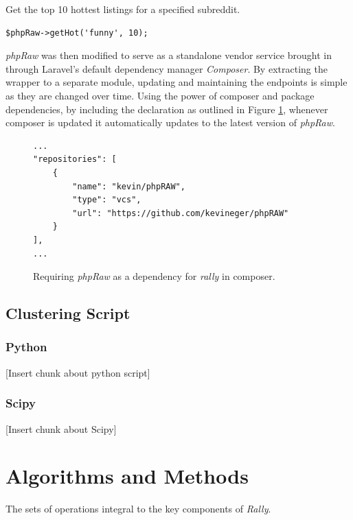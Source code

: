 \documentclass[msc,oneside]{ubcthesis}%
\begin{document}
\begin{center}
Get the top 10 hottest listings for a specified subreddit.
\end{center}
\begin{lstlisting}
$phpRaw->getHot('funny', 10);
\end{lstlisting}
\par
\textit{phpRaw} was then modified to serve as a standalone vendor service brought in through Laravel's default dependency manager \textit{Composer}. By extracting the wrapper to a separate module, updating and maintaining the endpoints is simple as they are changed over time. Using the power of composer and package dependencies, by including the declaration as outlined in Figure \ref{fig:composer}, whenever composer is updated it automatically updates to the latest version of \textit{phpRaw}.

\begin{figure}[!htb]
\begin{lstlisting}
...
"repositories": [
	{
		"name": "kevin/phpRAW",
		"type": "vcs",
		"url": "https://github.com/kevineger/phpRAW"
	}
],
...
\end{lstlisting}
\caption[Requiring phpRaw as a dependency in composer.]{
Requiring \textit{phpRaw} as a dependency for \textit{rally} in composer.}
\label{fig:composer}
\end{figure}

\section{Clustering Script}
\subsection{Python}
[Insert chunk about python script]
\subsection{Scipy}
[Insert chunk about Scipy]

\chapter{Algorithms and Methods}
The sets of operations integral to the key components of \textit{Rally}.
\end{document}

